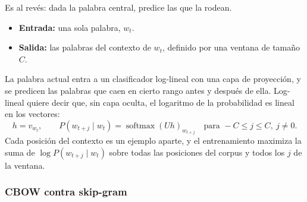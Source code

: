 \documentclass[11pt,letterpaper]{article}
\begin{document}
Es al revés: dada la palabra central, predice las que la rodean.

\begin{itemize}[itemsep=0.2em]
    \item \textbf{Entrada:} una sola palabra, $w_t$.
    \item \textbf{Salida:} las palabras del contexto de $w_t$, definido
          por una ventana de tamaño $C$.
\end{itemize}

La palabra actual entra a un clasificador log-lineal con una capa de
proyección, y se predicen las palabras que caen en cierto rango antes
y después de ella. Log-lineal quiere decir que, sin capa oculta, el
logaritmo de la probabilidad es lineal en los vectores:
\[
    h = v_{w_t} ,
    \qquad
    P(w_{t+j} \mid w_t) = \operatorname{softmax}(U h)_{w_{t+j}}
    \quad \text{para } -C \le j \le C,\ j \ne 0 .
\]
Cada posición del contexto es un ejemplo aparte, y el entrenamiento
maximiza la suma de $\log P(w_{t+j} \mid w_t)$ sobre todas las
posiciones del corpus y todos los $j$ de la ventana.

\subsubsection*{CBOW contra skip-gram}
\end{document}
